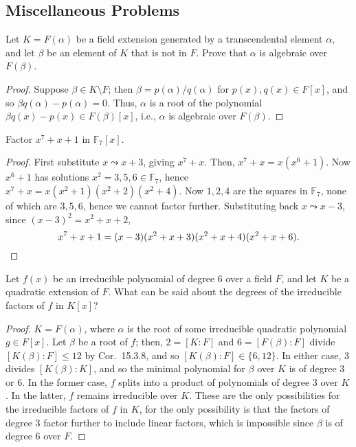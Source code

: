 \documentclass[12pt]{article}
\theoremstyle{remark}
\begin{document}
\begingroup
\renewcommand{\thesubsection}{\thesection.\Alph{subsection}}
\setcounter{subsection}{12}
\subsection{Miscellaneous Problems}
\begin{problem}
Let $K=F(\alpha)$ be a field extension generated by a transcendental element $\alpha$, and let $\beta$ be an element of $K$ that is not in $F$. Prove that $\alpha$ is algebraic over $F(\beta)$.
\end{problem}
\begin{proof}
  Suppose $\beta \in K \setminus F$; then $\beta = p(\alpha)/q(\alpha)$ for $p(x),q(x) \in F[x]$, and so $\beta q(\alpha) - p(\alpha) = 0$. Thus, $\alpha$ is a root of the polynomial $\beta q(x) - p(x) \in F(\beta)[x]$, i.e., $\alpha$ is algebraic over $F(\beta)$.
\end{proof}

\begin{problem}
  Factor $x^7 + x + 1$ in $\mathbb{F}_7[x]$.
\end{problem}
\begin{proof}
  First substitute $x \leadsto x+3$, giving $x^7+x$. Then, $x^7+x = x(x^6+1)$. Now $x^6 + 1$ has solutions $x^2 = 3,5,6 \in \mathbb{F}_7$, hence $x^7 + x = x(x^2+1)(x^2+2)(x^2+4)$. Now $1,2,4$ are the squares in $\mathbb{F}_7$, none of which are $3,5,6$, hence we cannot factor further. Substituting back $x \leadsto x-3$, since $(x-3)^2 = x^2+x+2$,
  \begin{equation*}
    x^7+x+1 = (x-3)(x^2+x+3)(x^2+x+4)(x^2+x+6).\qedhere
  \end{equation*}
\end{proof}

\begin{problem}
  Let $f(x)$ be an irreducible polynomial of degree $6$ over a field $F$, and let $K$ be a quadratic extension of $F$. What can be said about the degrees of the irreducible factors of $f$ in $K[x]$?
\end{problem}
\begin{proof}
  $K = F(\alpha)$, where $\alpha$ is the root of some irreducible quadratic polynomial $g \in F[x]$. Let $\beta$ be a root of $f$; then, $2 = [K : F]$ and $6 = [F(\beta):F]$ divide $[K(\beta):F] \le 12$ by Cor.~15.3.8, and so $[K(\beta):F] \in \{6,12\}$. In either case, $3$ divides $[K(\beta):K]$, and so the minimal polynomial for $\beta$ over $K$ is of degree $3$ or $6$. In the former case, $f$ splits into a product of polynomials of degree $3$ over $K$. In the latter, $f$ remains irreducible over $K$. These are the only possibilities for the irreducible factors of $f$ in $K$, for the only possibility is that the factors of degree $3$ factor further to include linear factors, which is impossible since $\beta$ is of degree $6$ over $F$.
\end{proof}
\end{document}
